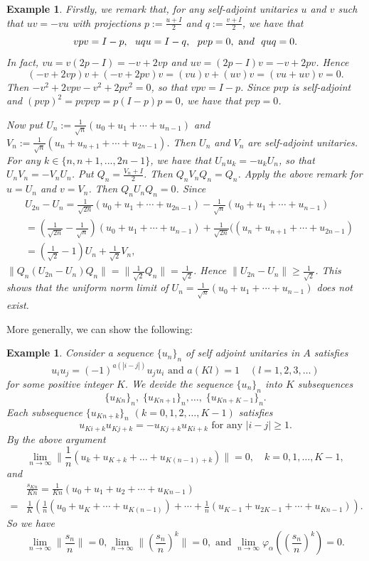 \documentclass[a4paper,12pt]{amsart}
\newtheorem{example}[definition]{Example}
\begin{document}
\begin{example}
Firstly, we remark that,  for any self-adjoint unitaries $u$ and $v$ such 
that $uv = -vu$ with projections $p :=\frac{u + I}{2}$ and $q := \frac{v + I}{2}$, we have that 
$$
vpv = I-p, \ \ uqu = I-q, \ \ pvp = 0, \ {\text and} \ \ quq = 0.
$$
In fact, $vu = v(2p-I) = -v + 2vp$ and $uv = (2p-I)v = -v + 2pv$.  
Hence 
$$
(-v + 2vp)v + (-v + 2pv)v = (vu)v + (uv)v = (vu +uv)v = 0.
$$  
Then 
$-v^2 +2vpv -v^2 +2pv^2 = 0$, so that $vpv = I - p$. 
Since $pvp$ is self-adjoint and $(pvp)^2 = pvpvp = p(I-p)p = 0$, we have that $pvp = 0$. 


Now put $U_n :=\frac{1}{{\sqrt n}}(u_0+u_1+\cdots +u_{n-1})$ and 
$V_n := \frac{1}{{\sqrt n}}(u_n+u_{n+1}+\cdots +u_{2n-1})$.  Then $U_n$ and $V_n$ are self-adjoint unitaries.  
For any $k \in \{n,n+1, ...,2n-1\}$, we have that $U_nu_k = -u_kU_n$, so that $U_nV_n = -V_nU_n$. 
Put $Q_n = \frac{V_n + I}{2}$.  Then $Q_nV_nQ_n = Q_n$.  Apply the above remark for $u = U_n$ and $v = V_n$.  Then 
$Q_nU_nQ_n = 0$.  Since  
\begin{align*}
& U_{2n} - U_n =   \frac{1}{{\sqrt {2n}}}(u_0+u_1+\cdots +u_{2n-1}) -  \frac{1}{{\sqrt n}}(u_0+u_1+\cdots +u_{n-1})\\ 
&=  (\frac{1}{{\sqrt {2n}}} - \frac{1}{{\sqrt n}})(u_0+u_1+\cdots +u_{n-1}) 
+  \frac{1}{{\sqrt {2n}}}((u_n+u_{n+1}+\cdots +u_{2n-1}) \\
&= (\frac{1}{\sqrt 2} -1)U_n + \frac{1}{\sqrt 2}V_n, 
\end{align*}
$\|Q_n(U_{2n} -U_n)Q_n \| = \| \frac{1}{\sqrt 2}Q_n \|= \frac{1}{\sqrt 2}$.  
Hence $\|U_{2n} - U_n\| \geq \frac{1}{\sqrt 2}$.  This shows that the uniform norm limit of   
$U_n =\frac{1}{{\sqrt n}}(u_0+u_1+\cdots +u_{n-1})$ does not exist.
\end{example} 
More generally, we can show the following: 

\begin{example} 
Consider a sequence $\{u_n\}_n$ of self adjoint unitaries in $A$ satisfies
\[   u_iu_j= (-1)^{a(|i-j|)}u_ju_i \text{ and } a(K l)=1 \quad (l=1,2,3,\ldots)  \]
for some positive integer $K$.
We devide the sequence $\{u_n\}_n$ into $K$ subsequences
\[  \{u_{Kn}\}_n, \; \{u_{Kn+1}\}_n, \ldots, \; \{u_{Kn+K-1} \}_n  .   \]
Each subsequence $\{u_{Kn+k}\}_n$ $(k=0,1,2,\ldots, K-1)$ satisfies 
\[     u_{Ki +k}u_{Kj+k} = - u_{Kj+k}u_{Ki+k}  \text{ for any }  |i-j|\ge 1.  \]
By the above argument
\[   \lim_{n\to\infty} \|\frac{1}{n}(u_k + u_{K+k}+ \ldots + u_{K(n-1)+k}) \|=0, \quad k=0,1,\ldots, K-1,    \]
and
\begin{align*}
 & \frac{s_{Kn}}{Kn}  = \frac{1}{Kn}(u_0+u_1+u_2+\cdots + u_{Kn-1})  \\
=  &  \frac{1}{K} ( \frac{1}{n}(u_0+u_K+ \cdots +u_{K(n-1)}) + \cdots  
 +\frac{1}{n}(u_{K-1} + u_{2K-1} + \cdots + u_{Kn-1})). 
\end{align*}
So we have
\[   \lim_{n\to\infty} \|\frac{s_n}{n}\| = 0,   \lim_{n\to\infty} \|(\frac{s_n}{n})^k\| = 0,  \text{ and }   \lim_{n\to\infty} \varphi_\alpha((\frac{s_n}{n})^k)=0 .  \]
\end{example} 
\end{document}
